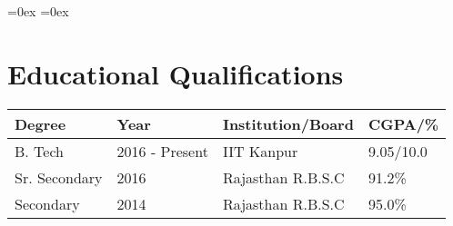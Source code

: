 \setlength\extrarowheight{3pt}  %
\aboverulesep=0ex  %
\belowrulesep=0ex  %

\section*{Educational Qualifications}
\begin{tabularx}{\textwidth}{|L|L|L|L|}

\toprule
\textbf{Degree} & \textbf{Year}  & \textbf{Institution/Board} & \textbf{CGPA/\%}\\
\midrule
B. Tech         & 2016 - Present & IIT Kanpur                 & 9.05/10.0\\
Sr. Secondary   & 2016           & Rajasthan R.B.S.C          & 91.2\%\\
Secondary       & 2014           & Rajasthan R.B.S.C          & 95.0\%\\
\bottomrule

\end{tabularx}
